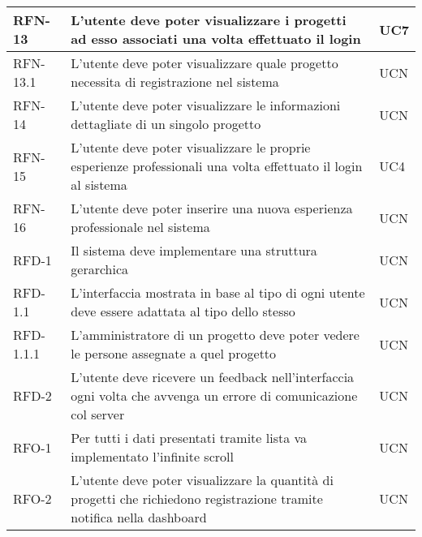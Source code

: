 \begin{table}
\begin{tabularx}{\textwidth}{lXl}
\hline
RFN-13 & L'utente deve poter visualizzare i progetti ad esso associati una volta effettuato il login & UC7 \\
\hline
RFN-13.1 & L'utente deve poter visualizzare quale progetto necessita di registrazione nel sistema & UCN \\
\hline
RFN-14 & L'utente deve poter visualizzare le informazioni dettagliate di un singolo progetto & UCN \\
\hline
RFN-15 & L'utente deve poter visualizzare le proprie esperienze professionali una volta effettuato il login al sistema & UC4 \\
\hline
RFN-16 & L'utente deve poter inserire una nuova esperienza professionale nel sistema & UCN \\
\hline
RFD-1 & Il sistema deve implementare una struttura gerarchica & UCN \\
\hline
RFD-1.1 & L'interfaccia mostrata in base al tipo di ogni utente deve essere adattata al tipo dello stesso & UCN \\
\hline
RFD-1.1.1 & L'amministratore di un progetto deve poter vedere le persone assegnate a quel progetto & UCN \\
\hline
RFD-2 & L'utente deve ricevere un feedback nell'interfaccia ogni volta che avvenga un errore di comunicazione col server & UCN \\
\hline
RFO-1 & Per tutti i dati presentati tramite lista va implementato l'infinite scroll & UCN \\
\hline
RFO-2 & L'utente deve poter visualizzare la quantità di progetti che richiedono registrazione tramite notifica nella dashboard & UCN \\
\hline
\end{tabularx}
\end{table}%

